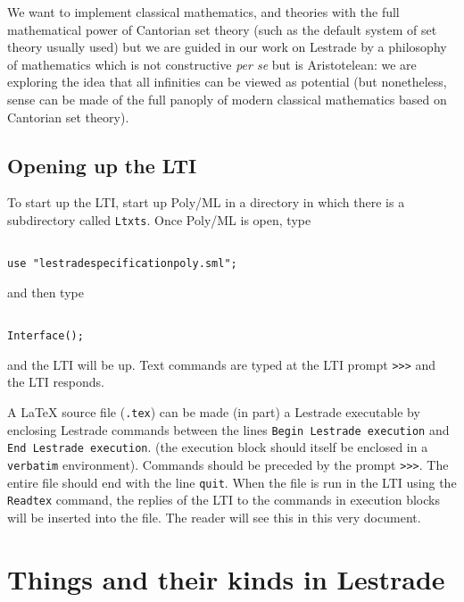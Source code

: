\documentclass[12pt]{article}
\begin{document}
We want to implement classical mathematics, and theories with the full mathematical power of Cantorian set theory (such as the default system of set theory usually used) but we are guided in our work on Lestrade by a philosophy of mathematics which is not constructive {\em per se\/} but is Aristotelean:  we are exploring the idea that all infinities can be viewed as potential (but nonetheless, sense can be made of the full panoply of modern classical mathematics based on Cantorian set theory).

\newpage

\subsection{Opening up the LTI}

To start up the LTI, start up Poly/ML in a directory in which there is a subdirectory called {\tt Ltxts}.  Once Poly/ML is open, type

\begin{verbatim}

use "lestradespecificationpoly.sml";

\end{verbatim}

and then type

\begin{verbatim}

Interface();

\end{verbatim}

and the LTI will be up.  Text commands are typed at the LTI prompt \verb|>>>| and the LTI responds.

A LaTeX source file ({\tt .tex}) can be made (in part) a Lestrade executable by enclosing Lestrade commands between
the lines \verb|Begin Lestrade execution| and \verb|End Lestrade execution|.  (the execution block should itself be enclosed in a {\tt verbatim} environment).  Commands should be preceded by the prompt \verb |>>>|.  The entire file should end with the line \verb|quit|.  When the file is run in the LTI using the {\tt Readtex} command, the replies of the LTI to the commands in execution blocks will be inserted into the file.  The reader will see this in this very document.

\newpage

\section{Things and their kinds in Lestrade}
\end{document}
